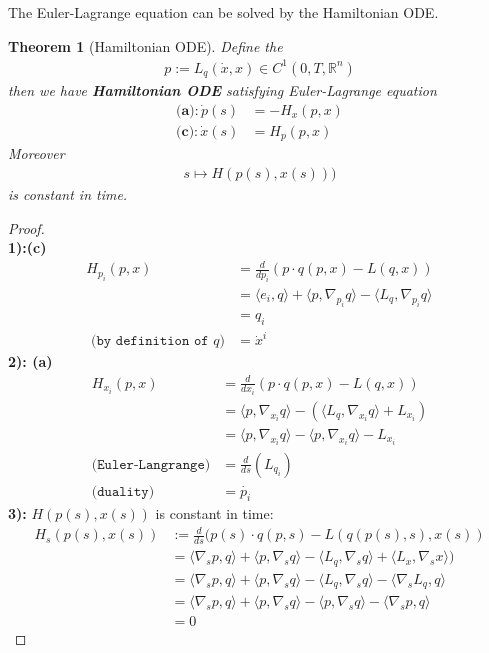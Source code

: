 \documentclass[a4paper,11pt,oneside,fleqn]{book}
\newtheorem{theorem}{Theorem}[section]
\theoremstyle{definition}
\theoremstyle{remark}
\begin{document}
The Euler-Lagrange equation can be solved by the Hamiltonian ODE. 

\begin{theorem}[Hamiltonian ODE]
Define the 
\begin{align*}
	p:= L_q(\dot{x}, x) \in C^1(0, T, \mathbb{R}^n)
\end{align*}
then we have \textbf{Hamiltonian ODE} satisfying Euler-Lagrange equation
\begin{align*}
\textbf{(a)}: \dot{p}(s) &= - H_x(p, x) \\
\textbf{(c)}: \dot{x}(s) &= H_p(p, x)	
\end{align*}
Moreover
\begin{align*}
	s \mapsto H(p(s), x(s)))
\end{align*}
is constant in time.
\end{theorem}
\begin{proof}\quad\\
\textbf{1):(c)}
\begin{align*}
	H_{p_i}(p, x) &= \frac{d}{dp_i}(p \cdot q(p, x) - L(q, x))\\
	&= \langle e_i, q \rangle + \langle p, \nabla_{p_i} q \rangle - \langle L_q, \nabla_{p_i} q \rangle \\
	&= q_i \\
	\texttt{ (by definition of $q$)}
	&= \dot{x}^i 
\end{align*}
\textbf{2): (a)}
\begin{align*}
	 H_{x_i}(p, x) &= \frac{d}{dx_i}(p \cdot q(p, x) - L(q, x))\\
	&=  \langle p,  \nabla_{x_i}q \rangle - (\langle L_q, \nabla_{x_i}q \rangle + L_{x_i}) \\
	&= \langle p,  \nabla_{x_i}q \rangle - \langle p, \nabla_{x_i} q \rangle - L_{x_i} \\
	\texttt{(Euler-Langrange)}&= \frac{d}{ds}(L_{q_i})  \\
	 \texttt{(duality) }&= \dot{p_i} 
\end{align*}
\textbf{3):} $H(p(s), x(s))$ is constant in time:
\begin{align*}
	H_s(p(s), x(s)) &:= \frac{d}{ds}(p(s) \cdot q(p, s) - L(q(p(s), s), x(s))\\
	&= \langle \nabla_s p , q \rangle  + \langle p, \nabla_s q \rangle 
	- \langle L_q , \nabla_s q \rangle + \langle L_x, \nabla_s x \rangle)\\
	&= \langle \nabla_s p , q \rangle  + \langle p, \nabla_s q \rangle
	-\langle L_q , \nabla_s q \rangle -  \langle \nabla_s L_q , q \rangle\\
	&= \langle \nabla_s p , q \rangle  + \langle p, \nabla_s q \rangle
	-\langle p , \nabla_s q \rangle - \langle \nabla_s p , q \rangle \\
	&= 0
\end{align*}

\end{proof}
\end{document}
